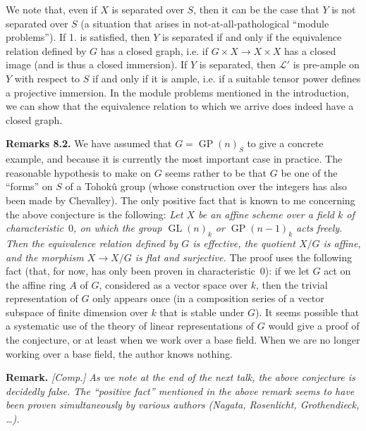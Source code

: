 \documentclass{article}
\newenvironment{rmenv}[1]
  {\phantomsection\par\medskip\noindent\textbf{#1.}\rmfamily}
  {\medskip}
\newcommand{\scr}[1]{{\mathscr{#1}}}
\DeclareMathOperator{\GL}{GL}
\DeclareMathOperator{\GP}{GP}
\newcommand{\oldpage}[1]{\marginpar{\footnotesize$\Big\vert$ \textit{p.~#1}}}
\begin{document}
We note that, even if $X$ is separated over $S$, then it can be the case that $Y$ is not separated over $S$ (a situation that arises in not-at-all-pathological ``module problems'').
If 1. is satisfied, then $Y$ is separated if and only if the equivalence relation defined by $G$ has a closed graph, i.e. if $G\times X\to X\times X$ has a closed image (and is thus a closed immersion).
If $Y$ is separated, then $\scr{L}'$ is pre-ample on $Y$ with respect to $S$ if and only if it is ample, i.e. if a suitable tensor power defines a projective immersion.
In the module problems mentioned in the introduction, we can show that the equivalence relation to which we arrive does indeed have a closed graph.

\begin{rmenv}{Remarks 8.2}
  We have assumed that $G=\GP(n)_S$ to give a concrete example, and because it is currently the most important case in practice.
  The reasonable hypothesis to make on $G$ seems rather to be that $G$ be one of the ``forms'' on $S$ of a Tohok\^{u} group (whose construction over the integers has also been made by Chevalley).
  The only positive fact that is known to me concerning the above conjecture is the following:
  \emph{Let $X$ be an affine scheme over a field $k$ of characteristic~$0$, on which the group $\GL(n)_k$ or $\GP(n-1)_k$ acts freely. Then the equivalence relation defined by $G$ is effective, the quotient $X/G$ is affine, and the morphism $X\to X/G$ is flat and surjective.}
  The proof uses the following fact (that, for now, has only been proven in characteristic~$0$):
  if we let $G$ act on the affine ring $A$ of $G$, considered as a vector space over $k$, then the trivial representation of $G$ only appears once (in a composition series of a vector subspace of finite dimension over $k$ that is stable under $G$).
  It seems possible that a systematic use of the
\oldpage{212-20}
  theory of linear representations of $G$ would give a proof of the conjecture, or at least when we work over a base field.
  When we are no longer working over a base field, the author knows nothing.
\end{rmenv}

\begin{rmenv}{Remark}
  \emph{[Comp.]}
  \emph{As we note at the end of the next talk, the above conjecture is decidedly false. The ``positive fact'' mentioned in the above remark seems to have been proven simultaneously by various authors (Nagata, Rosenlicht, Grothendieck, \ldots).}
\end{rmenv}
\end{document}
